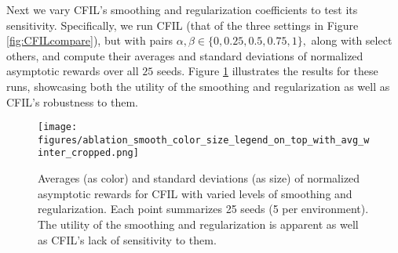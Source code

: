 Next we vary CFIL's smoothing and regularization coefficients to test its sensitivity. Specifically, we run CFIL (that of the three settings in Figure \ref{fig:CFILcompare}), but with pairs $\alpha, \beta \in \{0, 0.25, 0.5, 0.75, 1\},$ along with select others, and compute their averages and standard deviations of normalized asymptotic rewards over all $25$ seeds. Figure \ref{fig:ablation_smooth} illustrates the results for these runs, showcasing both the utility of the smoothing and regularization as well as CFIL's robustness to them.
\begin{figure}[t]
\vskip 0.1in
\centering
\texttt{[image: figures/ablation\_smooth\_color\_size\_legend\_on\_top\_with\_avg\_winter\_cropped.png]} %
\caption{Averages (as color) and standard deviations (as size) of normalized asymptotic rewards for CFIL with varied levels of smoothing and regularization. Each point summarizes 25 seeds (5 per environment). The utility of the smoothing and regularization is apparent as well as CFIL's lack of sensitivity to them.}
\label{fig:ablation_smooth}
\vskip -0.1in
\end{figure}

